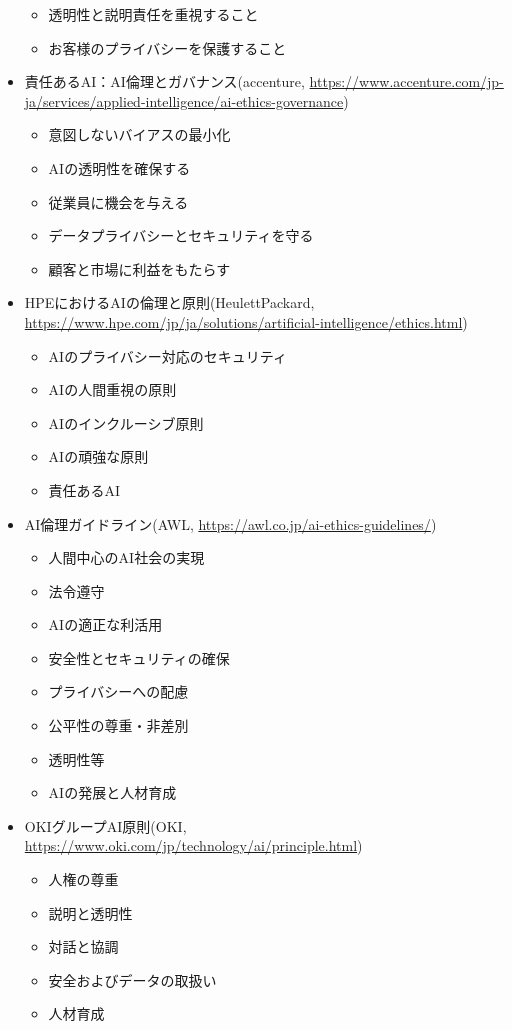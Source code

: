 \begin{itemize}
\begin{itemize}
		\item 透明性と説明責任を重視すること
		\item お客様のプライバシーを保護すること
	\end{itemize}
	\item 責任あるAI：AI倫理とガバナンス(accenture, \url{https://www.accenture.com/jp-ja/services/applied-intelligence/ai-ethics-governance})
	\begin{itemize}
		\item 意図しないバイアスの最小化
		\item AIの透明性を確保する
		\item 従業員に機会を与える
		\item データプライバシーとセキュリティを守る
		\item 顧客と市場に利益をもたらす
	\end{itemize}
	\item HPEにおけるAIの倫理と原則(HeulettPackard, \url{https://www.hpe.com/jp/ja/solutions/artificial-intelligence/ethics.html})
	\begin{itemize}
		\item AIのプライバシー対応のセキュリティ
		\item AIの人間重視の原則
		\item AIのインクルーシブ原則
		\item AIの頑強な原則
		\item 責任あるAI
	\end{itemize}
	\item AI倫理ガイドライン(AWL, \url{https://awl.co.jp/ai-ethics-guidelines/})
	\begin{itemize}
		\item 人間中心のAI社会の実現
		\item 法令遵守
		\item AIの適正な利活用
		\item 安全性とセキュリティの確保
		\item プライバシーへの配慮
		\item 公平性の尊重・非差別
		\item 透明性等
		\item AIの発展と人材育成
	\end{itemize}
	\item OKIグループAI原則(OKI, \url{https://www.oki.com/jp/technology/ai/principle.html})
	\begin{itemize}
		\item 人権の尊重
		\item 説明と透明性
		\item 対話と協調
		\item 安全およびデータの取扱い
		\item 人材育成
	\end{itemize}
\end{itemize}

